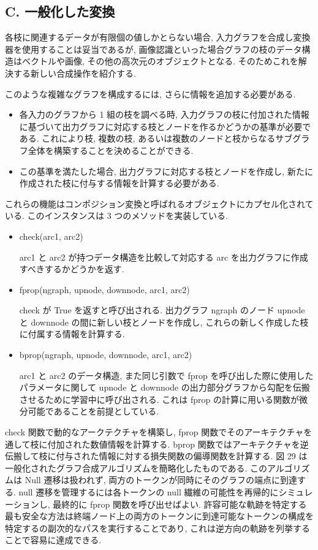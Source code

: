 \documentclass[twocolumn]{jarticle}     %
\begin{document}
\subsection*{C. 一般化した変換}
各枝に関連するデータが有限個の値しかとらない場合, 入力グラフを合成し変換器を使用することは妥当であるが, 画像認識といった場合グラフの枝のデータ構造はベクトルや画像, その他の高次元のオブジェクトとなる. そのためこれを解決する新しい合成操作を紹介する. 
\par
このような複雑なグラフを構成するには, さらに情報を追加する必要がある. 
\begin{itemize}
  \item 各入力のグラフから 1 組の枝を調べる時, 入力グラフの枝に付加された情報に基づいて出力グラフに対応する枝とノードを作るかどうかの基準が必要である. これにより枝, 複数の枝, あるいは複数のノードと枝からなるサブグラフ全体を構築することを決めることができる.
  \item この基準を満たした場合, 出力グラフに対応する枝とノードを作成し, 新たに作成された枝に付与する情報を計算する必要がある.
\end{itemize}
これらの機能はコンポジション変換と呼ばれるオブジェクトにカプセル化されている. 
このインスタンスは 3 つのメソッドを実装している.
\begin{itemize}
  \item check(arc1, arc2)
  \par
  arc1 と arc2 が持つデータ構造を比較して対応する arc を出力グラフに作成すべきするかどうかを返す.
  \item fprop(ngraph, upnode, downnode, arc1, arc2)
  \par
  check が True を返すと呼び出される. 出力グラフ ngraph のノード upnode と downnode の間に新しい枝とノードを作成し, これらの新しく作成した枝に付属する情報を計算する.
  \item bprop(ngraph, upnode, downnode, arc1, arc2)
  \par
  arc1 と arc2 のデータ構造, また同じ引数で fprop を呼び出した際に使用したパラメータに関して upnode と downnode の出力部分グラフから勾配を伝搬させるために学習中に呼び出される. 
  これは fprop の計算に用いる関数が微分可能であることを前提としている.
\end{itemize}
check 関数で動的なアークテクチャを構築し, fprop 関数でそのアーキテクチャを通して枝に付加された数値情報を計算する. bprop 関数ではアーキテクチャを逆伝搬して枝に付与された情報に対する損失関数の偏導関数を計算する. 
図 29 は一般化されたグラフ合成アルゴリズムを簡略化したものである. このアルゴリズムは Null 遷移は扱われず, 両方のトークンが同時にそのグラフの端点に到達する. null 遷移を管理するには各トークンの null 繊維の可能性を再帰的にシミュレーションし, 最終的に fprop 関数を呼び出せばよい. 許容可能な軌跡を特定する最も安全な方法は終端ノード上の両方のトークンに到達可能なトークンの構成を特定するの副次的なパスを実行することであり, これは逆方向の軌跡を列挙することで容易に達成できる. 
\end{document}
